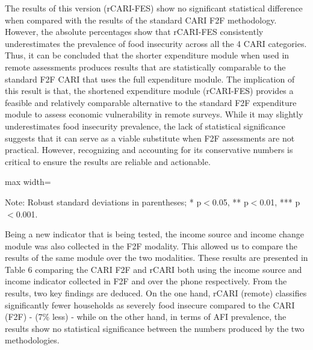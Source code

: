 \documentclass[11pt,harvard]{article}
\begin{document}
	The results of this version (rCARI-FES) show no significant statistical difference when compared with the results of the standard CARI F2F methodology. However, the absolute percentages show that rCARI-FES consistently underestimates the prevalence of food insecurity across all the 4 CARI categories. Thus, it can be concluded that the shorter expenditure module when used in remote assessments produces results that are statistically comparable to the standard F2F CARI that uses the full expenditure module. The implication of this result is that, the shortened expenditure module (rCARI-FES) provides a feasible and relatively comparable alternative to the standard F2F expenditure module to assess economic vulnerability in remote surveys. While it may slightly underestimates food insecurity prevalence, the lack of statistical significance suggests that it can serve as a viable substitute when F2F assessments are not practical. However, recognizing and accounting for its conservative numbers is critical to ensure the results are reliable and actionable.


	\begin{table}[htbp]
		\centering
		\begin{adjustbox}{max width=\textwidth}
			\begin{threeparttable}
				\caption{Impact of Survey Modality: CARI-FES vs. rCARI-FES}
				\scriptsize
				 
				\label{tab:CARI_FES_rCARI_Modality_BF}
			\begin{tablenotes}
					\item Note: Robust standard deviations in parentheses; * p$<$0.05, ** p$<$0.01, *** p$<$0.001. 
				\end{tablenotes}
			\end{threeparttable}
		\end{adjustbox}
	\end{table}
	
	Being a new indicator that is being tested, the income source and income change module was also collected in the F2F modality. This allowed us to compare the results of the same module over the two modalities. These results are presented in Table 6 comparing the CARI F2F and rCARI both using the income source and income indicator collected in F2F and over the phone respectively. From the results, two key findings are deduced. On the one hand, rCARI (remote) classifies significantly fewer households as severely food insecure compared to the CARI (F2F) - (7\% less) - while on the other hand, in terms of AFI prevalence, the results show no statistical significance between the numbers produced by the two methodologies.
	
\end{document}
